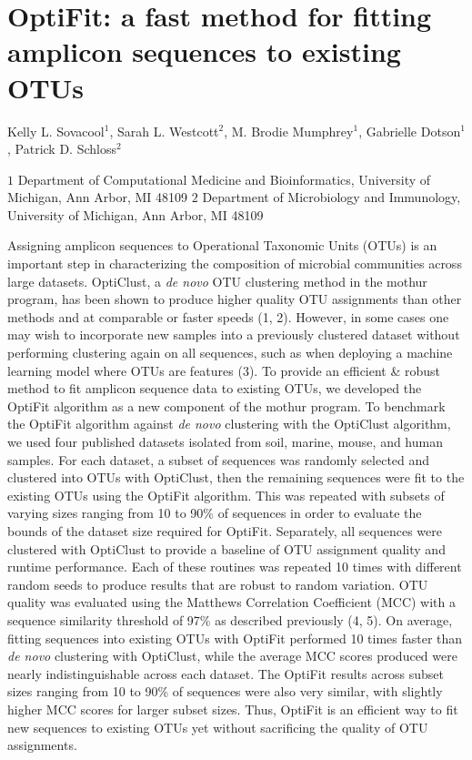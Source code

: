 \documentclass[
  11pt,
]{article}
\author{}
\date{\vspace{-2.5em}}
\begin{document}
\hypertarget{optifit-a-fast-method-for-fitting-amplicon-sequences-to-existing-otus}{%
\section{OptiFit: a fast method for fitting amplicon sequences to
existing
OTUs}\label{optifit-a-fast-method-for-fitting-amplicon-sequences-to-existing-otus}}

Kelly L. Sovacool\({^1}\), Sarah L. Westcott\({^2}\), M. Brodie
Mumphrey\({^1}\), Gabrielle Dotson\({^1}\), Patrick D. Schloss\({^2}\)

\(1\) Department of Computational Medicine and Bioinformatics,
University of Michigan, Ann Arbor, MI 48109 \(2\) Department of
Microbiology and Immunology, University of Michigan, Ann Arbor, MI 48109

\hfill\break
Assigning amplicon sequences to Operational Taxonomic Units (OTUs) is an
important step in characterizing the composition of microbial
communities across large datasets. OptiClust, a \emph{de novo} OTU
clustering method in the mothur program, has been shown to produce
higher quality OTU assignments than other methods and at comparable or
faster speeds (1, 2). However, in some cases one may wish to incorporate
new samples into a previously clustered dataset without performing
clustering again on all sequences, such as when deploying a machine
learning model where OTUs are features (3). To provide an efficient \&
robust method to fit amplicon sequence data to existing OTUs, we
developed the OptiFit algorithm as a new component of the mothur
program. To benchmark the OptiFit algorithm against \emph{de novo}
clustering with the OptiClust algorithm, we used four published datasets
isolated from soil, marine, mouse, and human samples. For each dataset,
a subset of sequences was randomly selected and clustered into OTUs with
OptiClust, then the remaining sequences were fit to the existing OTUs
using the OptiFit algorithm. This was repeated with subsets of varying
sizes ranging from 10 to 90\% of sequences in order to evaluate the
bounds of the dataset size required for OptiFit. Separately, all
sequences were clustered with OptiClust to provide a baseline of OTU
assignment quality and runtime performance. Each of these routines was
repeated 10 times with different random seeds to produce results that
are robust to random variation. OTU quality was evaluated using the
Matthews Correlation Coefficient (MCC) with a sequence similarity
threshold of 97\% as described previously (4, 5). On average, fitting
sequences into existing OTUs with OptiFit performed 10 times faster than
\emph{de novo} clustering with OptiClust, while the average MCC scores
produced were nearly indistinguishable across each dataset. The OptiFit
results across subset sizes ranging from 10 to 90\% of sequences were
also very similar, with slightly higher MCC scores for larger subset
sizes. Thus, OptiFit is an efficient way to fit new sequences to
existing OTUs yet without sacrificing the quality of OTU assignments.
\end{document}
